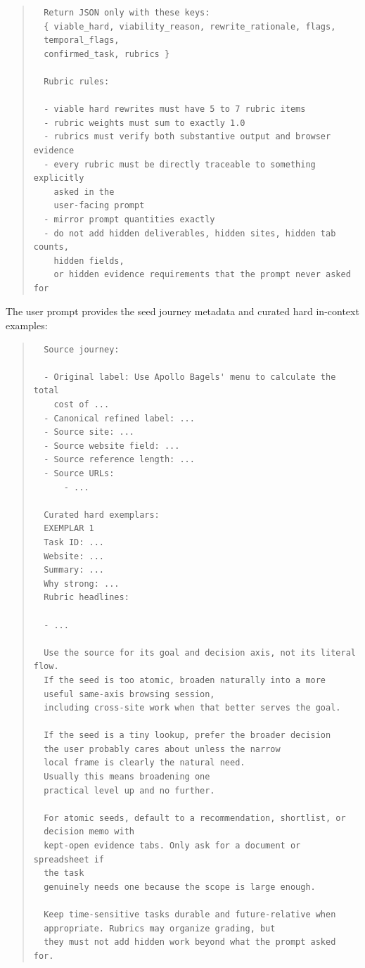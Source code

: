 \documentclass{article}
\theoremstyle{plain}
\theoremstyle{definition}
\theoremstyle{remark}
\begin{document}
\begin{quote}
\begin{verbatim}
  Return JSON only with these keys:
  { viable_hard, viability_reason, rewrite_rationale, flags,
  temporal_flags,
  confirmed_task, rubrics }

  Rubric rules:

  - viable hard rewrites must have 5 to 7 rubric items
  - rubric weights must sum to exactly 1.0
  - rubrics must verify both substantive output and browser evidence
  - every rubric must be directly traceable to something explicitly
    asked in the
    user-facing prompt
  - mirror prompt quantities exactly
  - do not add hidden deliverables, hidden sites, hidden tab counts,
    hidden fields,
    or hidden evidence requirements that the prompt never asked for
    \end{verbatim}
    \end{quote}

  \noindent The user prompt provides the seed journey metadata and
  curated hard in-context examples:

  \begin{quote}
  \scriptsize
  \begin{verbatim}
  Source journey:

  - Original label: Use Apollo Bagels' menu to calculate the total
    cost of ...
  - Canonical refined label: ...
  - Source site: ...
  - Source website field: ...
  - Source reference length: ...
  - Source URLs:
      - ...

  Curated hard exemplars:
  EXEMPLAR 1
  Task ID: ...
  Website: ...
  Summary: ...
  Why strong: ...
  Rubric headlines:

  - ...

  Use the source for its goal and decision axis, not its literal flow.
  If the seed is too atomic, broaden naturally into a more
  useful same-axis browsing session,
  including cross-site work when that better serves the goal.

  If the seed is a tiny lookup, prefer the broader decision
  the user probably cares about unless the narrow
  local frame is clearly the natural need.
  Usually this means broadening one
  practical level up and no further.

  For atomic seeds, default to a recommendation, shortlist, or
  decision memo with
  kept-open evidence tabs. Only ask for a document or spreadsheet if
  the task
  genuinely needs one because the scope is large enough.

  Keep time-sensitive tasks durable and future-relative when
  appropriate. Rubrics may organize grading, but
  they must not add hidden work beyond what the prompt asked for.
  \end{verbatim}
  \end{quote}
\end{document}
